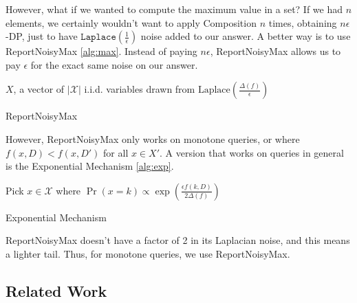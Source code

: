 \documentclass[11pt]{article}
\begin{document}
However, what if we wanted to compute the maximum value in a set? If we had $n$ elements, we certainly wouldn't want to apply Composition $n$ times, obtaining $n\epsilon$-DP, just to have $\texttt{Laplace}\left(\frac{1}{\epsilon}\right)$ noise added to our answer. A better way is to use ReportNoisyMax \ref{alg:max}. Instead of paying $n\epsilon$, ReportNoisyMax allows us to pay $\epsilon$ for the exact same noise on our answer.
\begin{algorithm}\label{alg:max}
\SetAlgoLined
{}
$X$, a vector of $|\mathcal{X}|$ i.i.d. variables drawn from $\text{Laplace}\left(\frac{\Delta(f)}{\epsilon}\right)$\;
\caption{ReportNoisyMax}
\end{algorithm}
However, ReportNoisyMax only works on monotone queries, or where $f(x, D) < f(x, D')$ for all $x \in X'$. A version that works on queries in general is the Exponential Mechanism \ref{alg:exp}.
\begin{algorithm}\label{alg:exp}
\SetAlgoLined
{}
Pick $x \in \mathcal{X}$ where $\Pr(x=k) \propto \exp\left(\frac{\epsilon f(k, D)}{2\Delta(f)}\right)$\;
\caption{Exponential Mechanism}
\end{algorithm}
ReportNoisyMax doesn't have a factor of 2 in its Laplacian noise, and this means a lighter tail. Thus, for monotone queries, we use ReportNoisyMax.
\subsection{Related Work}
\end{document}
